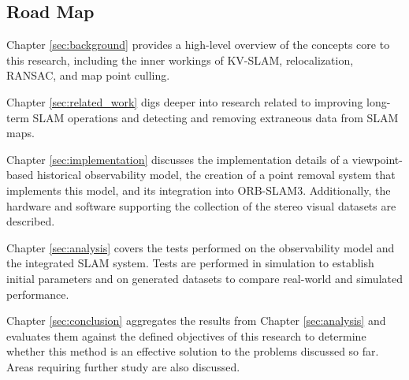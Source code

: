 \subsection{Road Map}

Chapter \ref{sec:background} provides a high-level overview of the concepts core to this research, including the inner workings of KV-SLAM, relocalization, RANSAC, and map point culling.

Chapter \ref{sec:related_work} digs deeper into research related to improving long-term SLAM operations and detecting and removing extraneous data from SLAM maps.

Chapter \ref{sec:implementation} discusses the implementation details of a viewpoint-based historical observability model, the creation of a point removal system that implements this model, and its integration into ORB-SLAM3. Additionally, the hardware and software supporting the collection of the stereo visual datasets are described.

Chapter \ref{sec:analysis} covers the tests performed on the observability model and the integrated SLAM system. Tests are performed in simulation to establish initial parameters and on generated datasets to compare real-world and simulated performance.

Chapter \ref{sec:conclusion} aggregates the results from Chapter \ref{sec:analysis} and evaluates them against the defined objectives of this research to determine whether this method is an effective solution to the problems discussed so far. Areas requiring further study are also discussed.
